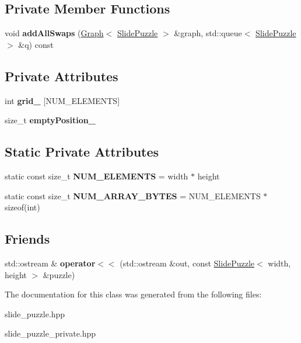 \subsection*{Private Member Functions}
\begin{DoxyCompactItemize}
\item 
\mbox{\label{class_slide_puzzle_abc59bd39ca93710701c737b6caa45d91}} 
void {\bfseries add\+All\+Swaps} (\hyperlink{class_graph}{Graph}$<$ \hyperlink{class_slide_puzzle}{Slide\+Puzzle} $>$ \&graph, std\+::queue$<$ \hyperlink{class_slide_puzzle}{Slide\+Puzzle} $>$ \&q) const
\end{DoxyCompactItemize}
\subsection*{Private Attributes}
\begin{DoxyCompactItemize}
\item 
\mbox{\label{class_slide_puzzle_a6df2fe211c43abb31ec0b30b1bb4d1d0}} 
int {\bfseries grid\+\_\+} \mbox{[}N\+U\+M\+\_\+\+E\+L\+E\+M\+E\+N\+TS\mbox{]}
\item 
\mbox{\label{class_slide_puzzle_a1df776acb5779653a21428c9d6aa006f}} 
size\+\_\+t {\bfseries empty\+Position\+\_\+}
\end{DoxyCompactItemize}
\subsection*{Static Private Attributes}
\begin{DoxyCompactItemize}
\item 
\mbox{\label{class_slide_puzzle_a17779f0ce9afe23532e10228d114b315}} 
static const size\+\_\+t {\bfseries N\+U\+M\+\_\+\+E\+L\+E\+M\+E\+N\+TS} = width $\ast$ height
\item 
\mbox{\label{class_slide_puzzle_afce7ede5094f55d76d7b7c426f197249}} 
static const size\+\_\+t {\bfseries N\+U\+M\+\_\+\+A\+R\+R\+A\+Y\+\_\+\+B\+Y\+T\+ES} = N\+U\+M\+\_\+\+E\+L\+E\+M\+E\+N\+TS $\ast$ sizeof(int)
\end{DoxyCompactItemize}
\subsection*{Friends}
\begin{DoxyCompactItemize}
\item 
\mbox{\label{class_slide_puzzle_a18714f5ba0b7dd3ad97ce44eca0b88e2}} 
std\+::ostream \& {\bfseries operator$<$$<$} (std\+::ostream \&out, const \hyperlink{class_slide_puzzle}{Slide\+Puzzle}$<$ width, height $>$ \&puzzle)
\end{DoxyCompactItemize}


The documentation for this class was generated from the following files\+:\begin{DoxyCompactItemize}
\item 
slide\+\_\+puzzle.\+hpp\item 
slide\+\_\+puzzle\+\_\+private.\+hpp\end{DoxyCompactItemize}
